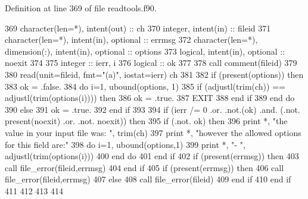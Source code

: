 Definition at line 369 of file readtools.\+f90.


\begin{DoxyCode}
369       \textcolor{keywordtype}{character(len=*)}, \textcolor{keywordtype}{intent(out)} :: ch
370       \textcolor{keywordtype}{integer}, \textcolor{keywordtype}{intent(in)} :: fileid
371       \textcolor{keywordtype}{character(len=*)}, \textcolor{keywordtype}{intent(in)}, \textcolor{keywordtype}{optional} :: errmsg
372       \textcolor{keywordtype}{character(len=*)}, \textcolor{keywordtype}{dimension(:)}, \textcolor{keywordtype}{intent(in)}, \textcolor{keywordtype}{optional} :: options
373       \textcolor{keywordtype}{logical}, \textcolor{keywordtype}{intent(in)}, \textcolor{keywordtype}{optional} :: noexit
374 
375       \textcolor{keywordtype}{integer} :: ierr, i
376       \textcolor{keywordtype}{logical} :: ok
377       
378       \textcolor{keyword}{call }comment(fileid)
379       
380       \textcolor{keyword}{read}(unit=fileid, fmt=\textcolor{stringliteral}{"(a)"}, iostat=ierr) ch
381       
382       \textcolor{keywordflow}{if} (\textcolor{keyword}{present}(options)) \textcolor{keywordflow}{then}
383         ok = .false.
384         \textcolor{keywordflow}{do} i=1, ubound(options, 1)
385           \textcolor{keywordflow}{if} (adjustl(trim(ch)) == adjustl(trim(options(i)))) \textcolor{keywordflow}{then}
386             ok = .true.
387             \textcolor{keywordflow}{EXIT}
388 \textcolor{keywordflow}{          end if}
389 \textcolor{keywordflow}{        end do}
390       \textcolor{keywordflow}{else}
391         ok = .true.     
392 \textcolor{keywordflow}{      end if}
393       
394       \textcolor{keywordflow}{if} (ierr /= 0 .or. .not.(ok) .and. (.not. \textcolor{keyword}{present}(noexit) .or. .not. noexit)) \textcolor{keywordflow}{then}
395         \textcolor{keywordflow}{if} (.not. ok) \textcolor{keywordflow}{then}
396           print *, \textcolor{stringliteral}{"the value in your input file was: "}, trim(ch)
397           print *, \textcolor{stringliteral}{"however the allowed options for this field are:"}
398           \textcolor{keywordflow}{do} i=1, ubound(options,1)
399             print *, \textcolor{stringliteral}{"-  "}, adjustl(trim(options(i)))
400 \textcolor{keywordflow}{          end do}
401 \textcolor{keywordflow}{        end if}
402         \textcolor{keywordflow}{if} (\textcolor{keyword}{present}(errmsg)) \textcolor{keywordflow}{then}
403           \textcolor{keyword}{call }file_error(fileid,errmsg)
404 \textcolor{keywordflow}{        end if}
405         \textcolor{keywordflow}{if} (\textcolor{keyword}{present}(errmsg)) \textcolor{keywordflow}{then}
406           \textcolor{keyword}{call }file_error(fileid,errmsg)
407         \textcolor{keywordflow}{else}
408           \textcolor{keyword}{call }file_error(fileid)
409 \textcolor{keywordflow}{        end if}
410 \textcolor{keywordflow}{      end if}
411       
412       
413       
414       
\end{DoxyCode}
